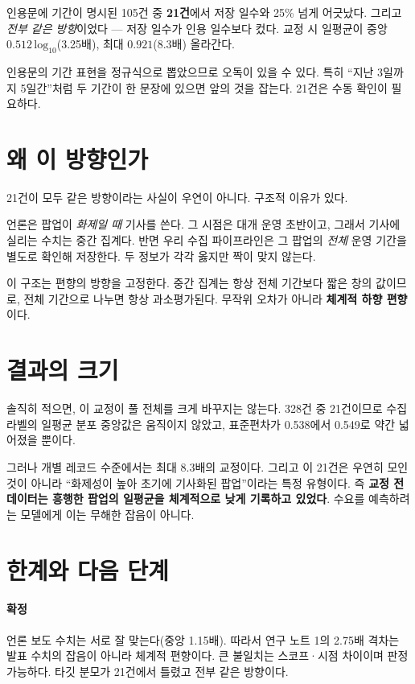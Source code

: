 \documentclass[10pt]{article}
\begin{document}
인용문에 기간이 명시된 105건 중 \textbf{21건}에서 저장 일수와 25\% 넘게 어긋났다.
그리고 \emph{전부 같은 방향}이었다 --- 저장 일수가 인용 일수보다 컸다.
교정 시 일평균이 중앙 $0.512\,\text{log}_{10}$(3.25배), 최대 $0.921$(8.3배) 올라간다.

{인용문의 기간 표현을 정규식으로 뽑았으므로 오독이 있을 수 있다. 특히 ``지난 3일까지
5일간''처럼 두 기간이 한 문장에 있으면 앞의 것을 잡는다. 21건은 수동 확인이 필요하다.}

\section{왜 이 방향인가}

21건이 모두 같은 방향이라는 사실이 우연이 아니다. 구조적 이유가 있다.

언론은 팝업이 \emph{화제일 때} 기사를 쓴다. 그 시점은 대개 운영 초반이고, 그래서 기사에
실리는 수치는 중간 집계다. 반면 우리 수집 파이프라인은 그 팝업의 \emph{전체} 운영 기간을
별도로 확인해 저장한다. 두 정보가 각각 옳지만 짝이 맞지 않는다.

이 구조는 편향의 방향을 고정한다. 중간 집계는 항상 전체 기간보다 짧은 창의 값이므로,
전체 기간으로 나누면 항상 과소평가된다. 무작위 오차가 아니라 \textbf{체계적 하향 편향}이다.

\section{결과의 크기}

솔직히 적으면, 이 교정이 풀 전체를 크게 바꾸지는 않는다. 328건 중 21건이므로
수집 라벨의 일평균 분포 중앙값은 움직이지 않았고, 표준편차가 0.538에서 0.549로
약간 넓어졌을 뿐이다.

그러나 개별 레코드 수준에서는 최대 8.3배의 교정이다. 그리고 이 21건은 우연히 모인 것이
아니라 ``화제성이 높아 초기에 기사화된 팝업''이라는 특정 유형이다. 즉 \textbf{교정 전
데이터는 흥행한 팝업의 일평균을 체계적으로 낮게 기록하고 있었다}. 수요를 예측하려는
모델에게 이는 무해한 잡음이 아니다.

\section{한계와 다음 단계}

\paragraph{확정}
언론 보도 수치는 서로 잘 맞는다(중앙 1.15배). 따라서 연구 노트 1의 2.75배 격차는
발표 수치의 잡음이 아니라 체계적 편향이다. 큰 불일치는 스코프·시점 차이이며 판정 가능하다.
타깃 분모가 21건에서 틀렸고 전부 같은 방향이다.
\end{document}
